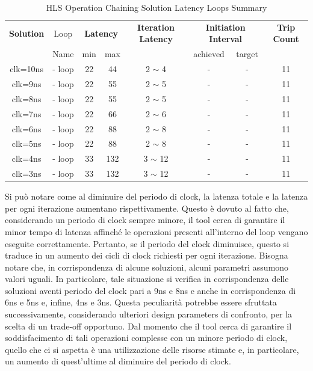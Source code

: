 \begin{table}[H]
    \centering
    \begin{tabular}{|c|c|c|c|c|c|c|c|}
        \hline
        \multicolumn{1}{|c|}{\textbf{Solution}} & \multicolumn{1}{|c|}{Loop} & \multicolumn{2}{|c|}{\textbf{Latency}} & \multicolumn{1}{c|}{\textbf{Iteration Latency}} & \multicolumn{2}{c|}{\textbf{Initiation Interval}} & \multicolumn{1}{c|}{\textbf{Trip Count}}  \\
        & Name & min & max &  & achieved & target &  \\
        \hline
        clk=10ns & - loop & 22 & 44 & 2 $\sim$ 4 & - & - & 11 \\
        \hline
        clk=9ns & - loop & 22 & 55 & 2 $\sim$ 5 & - & - & 11 \\
        \hline
        clk=8ns & - loop & 22 & 55 & 2 $\sim$ 5 & - & - & 11 \\
        \hline
        clk=7ns & - loop & 22 & 66 & 2 $\sim$ 6 & - & - & 11 \\
        \hline
        clk=6ns & - loop & 22 & 88 & 2 $\sim$ 8 & - & - & 11 \\
        \hline
        clk=5ns & - loop & 22 & 88 & 2 $\sim$ 8 & - & - & 11 \\
        \hline
        clk=4ns & - loop & 33 & 132 & 3 $\sim$ 12 & - & - & 11 \\
        \hline
        clk=3ns & - loop & 33 & 132 & 3 $\sim$ 12 & - & - & 11 \\
        \hline
    \end{tabular}
    \caption{HLS Operation Chaining Solution Latency Loops Summary }
    \label{tab:hls-operation-chaining-solution-loop-summary}
\end{table}
Si può notare come al diminuire del periodo di clock, la latenza totale e la latenza per ogni iterazione aumentano rispettivamente. Questo è dovuto al fatto che, considerando un periodo di clock sempre minore, il tool cerca di garantire il minor tempo di latenza affinché le operazioni presenti all'interno del loop vengano eseguite correttamente. Pertanto, se il periodo del clock diminuisce, questo si traduce in un aumento dei cicli di clock richiesti per ogni iterazione. Bisogna notare che, in corrispondenza di alcune soluzioni, alcuni parametri assumono valori uguali. In particolare, tale situazione si verifica in corrispondenza delle soluzioni aventi periodo del clock pari a 9ns e 8ns e anche in corrispondenza di 6ns e 5ns e, infine, 4ns e 3ns. Questa peculiarità potrebbe essere sfruttata successivamente, considerando ulteriori design parameters di confronto, per la scelta di un trade-off opportuno. Dal momento che il tool cerca di garantire il soddisfacimento di tali operazioni complesse con un minore periodo di clock, quello che ci si aspetta è una utilizzazione delle risorse stimate e, in particolare, un aumento di quest'ultime al diminuire del periodo di clock.
